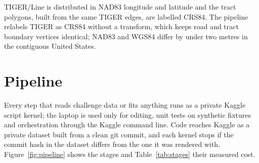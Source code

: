 \documentclass[11pt]{article}
\begin{document}
\begin{table}[htbp]
\centering
\small
\caption{Reference sources rebuilt from their publishers. ``Final'' marks the
sources used by the selected submissions S25 and S24.}
\label{tab:sources}
\end{table}

TIGER/Line is distributed in NAD83 longitude and latitude and the tract
polygons, built from the same TIGER edges, are labelled CRS84. The pipeline
relabels TIGER as CRS84 without a transform, which keeps road and tract
boundary vertices identical; NAD83 and WGS84 differ by under two metres in
the contiguous United States.

\section{Pipeline}
\label{sec:pipeline}

Every step that reads challenge data or fits anything runs as a private
Kaggle script kernel; the laptop is used only for editing, unit tests on
synthetic fixtures and orchestration through the Kaggle command line. Code
reaches Kaggle as a private dataset built from a clean git commit, and each
kernel stops if the commit hash in the dataset differs from the one it was
rendered with. Figure~\ref{fig:pipeline} shows the stages and
Table~\ref{tab:stages} their measured cost.
\end{document}
